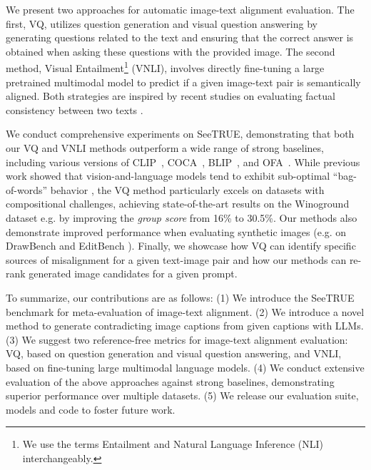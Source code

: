 \documentclass{article}
\newcommand{\datasetname}[0]{SeeTRUE\xspace}
\newcommand{\VQSQR}[0]{VQ\xspace}
\begin{document}
We present two approaches for automatic image-text alignment evaluation. The first, \VQSQR, utilizes question generation and visual question answering by generating questions related to the text \citep{changpinyo2022all} and ensuring that the correct answer is obtained when asking these questions with the provided image. The second method, Visual Entailment\footnote{We use the terms Entailment and Natural Language Inference (NLI) interchangeably.}  (VNLI), involves directly fine-tuning a large pretrained multimodal model to predict if a given image-text pair is semantically aligned. Both strategies are inspired by recent studies on evaluating factual consistency between two texts \citep{honovich2021q, honovich-etal-2022-true-evaluating, summac_laban_2022, tang2022understanding}.

We conduct comprehensive experiments on \datasetname, demonstrating that both our \VQSQR and VNLI methods outperform a wide range of strong baselines, including various versions of CLIP~\citep{radford2021learning}, COCA~\citep{yu2022coca}, BLIP~\citep{li2022blip,li2023blip}, and OFA~\citep{wang2022ofa}. While previous work showed that vision-and-language models tend to exhibit sub-optimal ``bag-of-words'' behavior \citep{yuksekgonul2022and}, the \VQSQR method particularly excels on datasets with compositional challenges, achieving state-of-the-art results on the Winoground dataset \citep{thrush2022winoground} e.g. by improving the \emph{group score} from 16\% to 30.5\%. Our methods also demonstrate improved performance when evaluating synthetic images (e.g. on DrawBench \cite{saharia2022photorealistic} and EditBench \cite{wang2022imagen}). Finally, we showcase how \VQSQR can identify specific sources of misalignment for a given text-image pair and how our methods can re-rank generated image candidates for a given prompt.

To summarize, our contributions are as follows: (1) We introduce the \datasetname benchmark for meta-evaluation of image-text alignment. (2) We introduce a novel method to generate contradicting image captions from given captions with LLMs. (3) We suggest two reference-free metrics for image-text alignment evaluation: \VQSQR, based on question generation and visual question answering, and VNLI, based on fine-tuning large multimodal language models. (4) We conduct extensive evaluation of the above approaches against strong baselines, demonstrating superior performance over multiple datasets. (5) We release our evaluation suite, models and code to foster future work.
 
\end{document}
